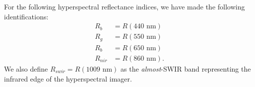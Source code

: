 \documentclass[journal,article,submit,pdftex,moreauthors]{Definitions/mdpi}
\begin{document}

\appendixstart
\appendix
\section[\appendixname~\thesection]{}\label{appendix:spec-indices}
\subsection[\appendixname~\thesubsection]{}

For the following hyperspectral reflectance indices, we have made the following identifications:
\begin{align}\label{eq:ref-bands}
    R_b &= R(440 \text{ nm}) \\
    R_g &= R(550 \text{ nm}) \\
    R_b &= R(650 \text{ nm}) \\
    R_{nir} &= R(860 \text{ nm}).
\end{align}
We also define $R_{swir} = R(1009 \text{ nm})$ as the \textit{almost}-SWIR band representing the infrared edge of the hyperspectral imager.
\end{document}
